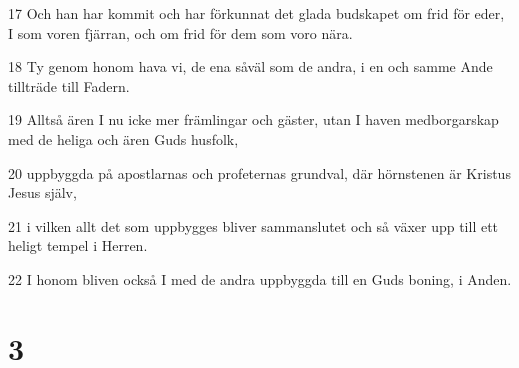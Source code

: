 \par 17 Och han har kommit och har förkunnat det glada budskapet om frid för eder, I som voren fjärran, och om frid för dem som voro nära.
\par 18 Ty genom honom hava vi, de ena såväl som de andra, i en och samme Ande tillträde till Fadern.
\par 19 Alltså ären I nu icke mer främlingar och gäster, utan I haven medborgarskap med de heliga och ären Guds husfolk,
\par 20 uppbyggda på apostlarnas och profeternas grundval, där hörnstenen är Kristus Jesus själv,
\par 21 i vilken allt det som uppbygges bliver sammanslutet och så växer upp till ett heligt tempel i Herren.
\par 22 I honom bliven också I med de andra uppbyggda till en Guds boning, i Anden.

\chapter{3}

